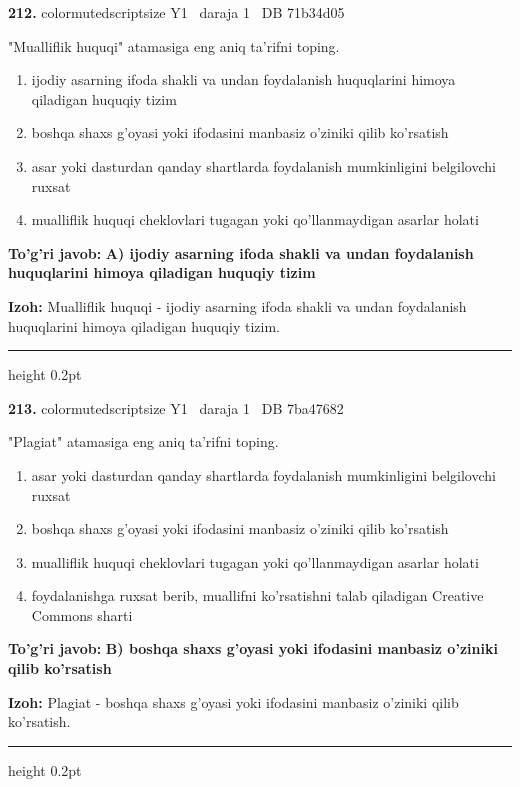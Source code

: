 \documentclass[10pt,a4paper,oneside]{article}
\begin{document}
\noindent\textbf{\color{ink}212.}  {color{muted}scriptsize Y1 \textbullet\ daraja 1 \textbullet\ DB 71b34d05}
\par
"Mualliflik huquqi" atamasiga eng aniq ta'rifni toping.
\begin{enumerate}[label=\Alph*),leftmargin=9mm]
\item ijodiy asarning ifoda shakli va undan foydalanish huquqlarini himoya qiladigan huquqiy tizim
\item boshqa shaxs g'oyasi yoki ifodasini manbasiz o'ziniki qilib ko'rsatish
\item asar yoki dasturdan qanday shartlarda foydalanish mumkinligini belgilovchi ruxsat
\item mualliflik huquqi cheklovlari tugagan yoki qo'llanmaydigan asarlar holati
\end{enumerate}
\begin{tcolorbox}[enhanced,breakable,colback=teal!4,colframe=teal!50!black,boxrule=0.5pt,arc=1.1mm,left=3mm,right=3mm,top=1.7mm,bottom=1.7mm,before skip=2mm,after skip=2mm]
\textbf{\color{teal}To'g'ri javob:} \textbf{A) ijodiy asarning ifoda shakli va undan foydalanish huquqlarini himoya qiladigan huquqiy tizim}
\par\smallskip
\textbf{Izoh:} Mualliflik huquqi - ijodiy asarning ifoda shakli va undan foydalanish huquqlarini himoya qiladigan huquqiy tizim.
\end{tcolorbox}
\vspace{2mm}\hrule height 0.2pt \vspace{3mm}

\noindent\textbf{\color{ink}213.}  {color{muted}scriptsize Y1 \textbullet\ daraja 1 \textbullet\ DB 7ba47682}
\par
"Plagiat" atamasiga eng aniq ta'rifni toping.
\begin{enumerate}[label=\Alph*),leftmargin=9mm]
\item asar yoki dasturdan qanday shartlarda foydalanish mumkinligini belgilovchi ruxsat
\item boshqa shaxs g'oyasi yoki ifodasini manbasiz o'ziniki qilib ko'rsatish
\item mualliflik huquqi cheklovlari tugagan yoki qo'llanmaydigan asarlar holati
\item foydalanishga ruxsat berib, muallifni ko'rsatishni talab qiladigan Creative Commons sharti
\end{enumerate}
\begin{tcolorbox}[enhanced,breakable,colback=teal!4,colframe=teal!50!black,boxrule=0.5pt,arc=1.1mm,left=3mm,right=3mm,top=1.7mm,bottom=1.7mm,before skip=2mm,after skip=2mm]
\textbf{\color{teal}To'g'ri javob:} \textbf{B) boshqa shaxs g'oyasi yoki ifodasini manbasiz o'ziniki qilib ko'rsatish}
\par\smallskip
\textbf{Izoh:} Plagiat - boshqa shaxs g'oyasi yoki ifodasini manbasiz o'ziniki qilib ko'rsatish.
\end{tcolorbox}
\vspace{2mm}\hrule height 0.2pt \vspace{3mm}
\end{document}
